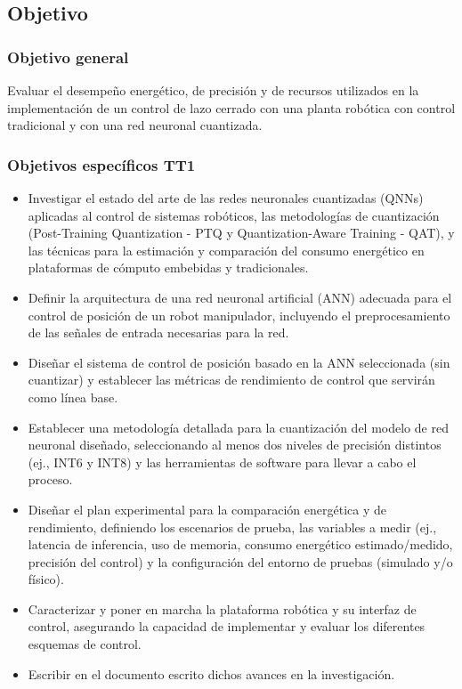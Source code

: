 \documentclass[12pt]{article}
\begin{document}
\subsection*{Objetivo}
\subsubsection{Objetivo general}
Evaluar el desempeño energético, de precisión y de recursos utilizados en la implementación de un control de lazo cerrado con una planta robótica con control tradicional y con una red neuronal cuantizada.


\subsubsection{Objetivos específicos TT1}

\begin{itemize}
    \item Investigar el estado del arte de las redes neuronales cuantizadas (QNNs) aplicadas al control de sistemas robóticos, las metodologías de cuantización (Post-Training Quantization - PTQ y Quantization-Aware Training - QAT), y las técnicas para la estimación y comparación del consumo energético en plataformas de cómputo embebidas y tradicionales.
    \item Definir la arquitectura de una red neuronal artificial (ANN) adecuada para el control de posición de un robot manipulador, incluyendo el preprocesamiento de las señales de entrada necesarias para la red.
    \item Diseñar el sistema de control de posición basado en la ANN seleccionada (sin cuantizar) y establecer las métricas de rendimiento de control que servirán como línea base.
    \item Establecer una metodología detallada para la cuantización del modelo de red neuronal diseñado, seleccionando al menos dos niveles de precisión distintos (ej., INT6 y INT8) y las herramientas de software para llevar a cabo el proceso. 
    \item Diseñar el plan experimental para la comparación energética y de rendimiento, definiendo los escenarios de prueba, las variables a medir (ej., latencia de inferencia, uso de memoria, consumo energético estimado/medido, precisión del control) y la configuración del entorno de pruebas (simulado y/o físico).
    \item Caracterizar y poner en marcha la plataforma robótica y su interfaz de control, asegurando la capacidad de implementar y evaluar los diferentes esquemas de control.
    \item Escribir en el documento escrito dichos avances en la investigación.
    
\end{itemize}
\end{document}
